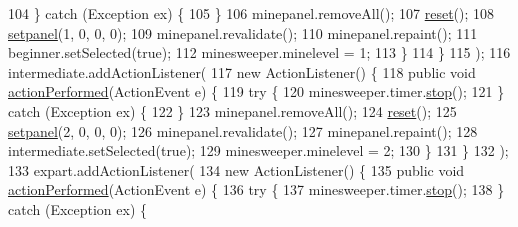 \begin{DoxyCode}
104                         \} \textcolor{keywordflow}{catch} (Exception ex) \{                        
105                         \}
106                         minepanel.removeAll();
107                         \hyperlink{classhufs_1_1cse_1_1khk_1_1_minesweeper_u_i_a137388c25def2c90fe13e34d6234207d}{reset}();
108                         \hyperlink{classhufs_1_1cse_1_1khk_1_1_minesweeper_u_i_a9a871b3969d0f0c00cf420902d09cc18}{setpanel}(1, 0, 0, 0);
109                         minepanel.revalidate();
110                         minepanel.repaint();
111                         beginner.setSelected(\textcolor{keyword}{true});
112                         minesweeper.minelevel = 1;
113                     \}
114                 \}
115         );
116         intermediate.addActionListener(
117                 \textcolor{keyword}{new} ActionListener() \{
118                     \textcolor{keyword}{public} \textcolor{keywordtype}{void} \hyperlink{classhufs_1_1cse_1_1khk_1_1_minesweeper_u_i_a896a8e57a116a0b4b43fb88b575ab5b8}{actionPerformed}(ActionEvent e) \{
119                         \textcolor{keywordflow}{try} \{
120                             minesweeper.timer.\hyperlink{classhufs_1_1cse_1_1khk_1_1_timer_a5ab9e7bd1e1b1f74604887cd99b27972}{stop}();
121                         \} \textcolor{keywordflow}{catch} (Exception ex) \{                        
122                         \}
123                         minepanel.removeAll();
124                         \hyperlink{classhufs_1_1cse_1_1khk_1_1_minesweeper_u_i_a137388c25def2c90fe13e34d6234207d}{reset}();
125                         \hyperlink{classhufs_1_1cse_1_1khk_1_1_minesweeper_u_i_a9a871b3969d0f0c00cf420902d09cc18}{setpanel}(2, 0, 0, 0);
126                         minepanel.revalidate();
127                         minepanel.repaint();
128                         intermediate.setSelected(\textcolor{keyword}{true});
129                         minesweeper.minelevel = 2;
130                     \}
131                 \}
132         );
133         expart.addActionListener(
134                 \textcolor{keyword}{new} ActionListener() \{
135                     \textcolor{keyword}{public} \textcolor{keywordtype}{void} \hyperlink{classhufs_1_1cse_1_1khk_1_1_minesweeper_u_i_a896a8e57a116a0b4b43fb88b575ab5b8}{actionPerformed}(ActionEvent e) \{
136                         \textcolor{keywordflow}{try} \{
137                             minesweeper.timer.\hyperlink{classhufs_1_1cse_1_1khk_1_1_timer_a5ab9e7bd1e1b1f74604887cd99b27972}{stop}();
138                         \} \textcolor{keywordflow}{catch} (Exception ex) \{                        

\end{DoxyCode}
